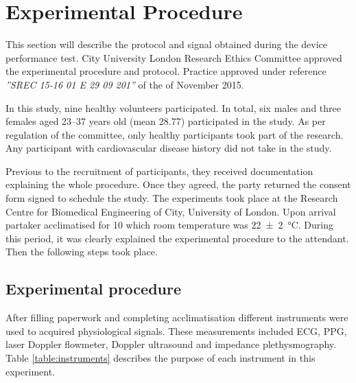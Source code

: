 
\chapter{Experimental Procedure}  %
\label{chapter procedure}

\ifpdf
    \graphicspath{{Chapter4/Figs/Raster/}{Chapter4/Figs/PDF/}{Chapter4/Figs/}}
\else
    \graphicspath{{Chapter4/Figs/Vector/}{Chapter4/Figs/}}
\fi

This section will describe the protocol and signal obtained during the device performance test. City University London Research Ethics Committee approved the experimental procedure and protocol. Practice approved under reference \textit{''SREC 15-16 01 E 29 09 201''} of the  of November 2015. 

In this study, nine healthy volunteers participated. In total, six males and three females aged \numrange{23}{37} years old (mean 28.77) participated in the study. As per regulation of the committee, only healthy participants took part of the research. Any participant with cardiovascular disease history did not take in the study. 

Previous to the recruitment of participants, they received documentation explaining the whole procedure. Once they agreed, the party returned the consent form signed to schedule the study. The experiments took place at the Research Centre for Biomedical Engineering of City, University of London. Upon arrival partaker acclimatised for \SI{10}{\min} which room temperature was \SI{22(2)}{\degreeCelsius}. During this period, it was clearly explained the experimental procedure to the attendant. Then the following steps took place.


\section{Experimental procedure} %
\label{section procedure 1}

After filling paperwork and completing acclimatisation different instruments were used to acquired physiological signals. These measurements included ECG, PPG, laser Doppler flowmeter, Doppler ultrasound and impedance plethysmography. Table \ref{table:instruments} describes the purpose of each instrument in this experiment. 

